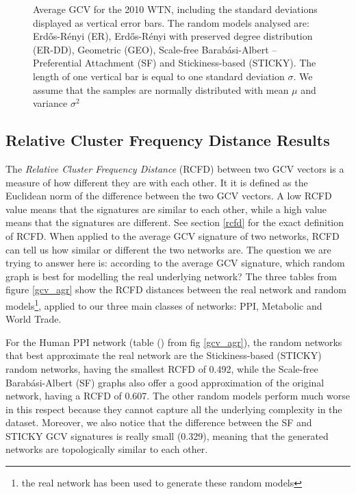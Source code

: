\begin{figure}[H]
\begin{subfigure}[b]{1.0\textwidth}
  \end{subfigure}
  \caption[Average GCV for the World Trade network and ER, ER-DD, GEO, SF and STICKY random models]{Average GCV for the 2010 WTN, including the standard deviations displayed as vertical error bars. The random models analysed are: Erd\H{o}s-R\'{e}nyi (ER), Erd\H{o}s-R\'{e}nyi with preserved degree distribution (ER-DD), Geometric (GEO), Scale-free Barab\'{a}si-Albert -- Preferential Attachment (SF) and 
Stickiness-based (STICKY). The length of one vertical bar is equal to one standard deviation $\sigma$. We assume that the samples are normally distributed with mean $\mu$ and variance $\sigma^2$}
  \label{trade_spreads}
\end{figure}


\subsection{Relative Cluster Frequency Distance Results}
\label{rcfd_res}

The \emph{Relative Cluster Frequency Distance} (RCFD) between two GCV vectors is a measure of how different they are with each other. It it is defined as the Euclidean norm of the difference between the two GCV vectors. A low RCFD value means that the signatures are similar to each other, while a high value means that the signatures are different. See section \ref{rcfd} for the exact definition of RCFD. When applied to the average GCV signature of two networks, RCFD can tell us how similar or different the two networks are. The question we are trying to answer here is: according to the average GCV signature, which random graph is best for modelling the real underlying network? The three tables from figure \ref{gcv_agr} show the RCFD distances between the real network and random models\footnote{the real network has been used to generate these random models}, applied to our three main classes of networks: PPI, Metabolic and World Trade. 

For the Human PPI network (table () from fig \ref{gcv_agr}), the random networks that best approximate the real network are the Stickiness-based (STICKY) random networks, having the smallest RCFD of 0.492, while the Scale-free Barab\'{a}si-Albert (SF) graphs also offer a good approximation of the original network, having a RCFD of 0.607. The other random models perform much worse in this respect because they cannot capture all the underlying complexity in the dataset. Moreover, we also notice that the difference between the SF and STICKY GCV signatures is really small (0.329), meaning that the generated networks are topologically similar to each other.

